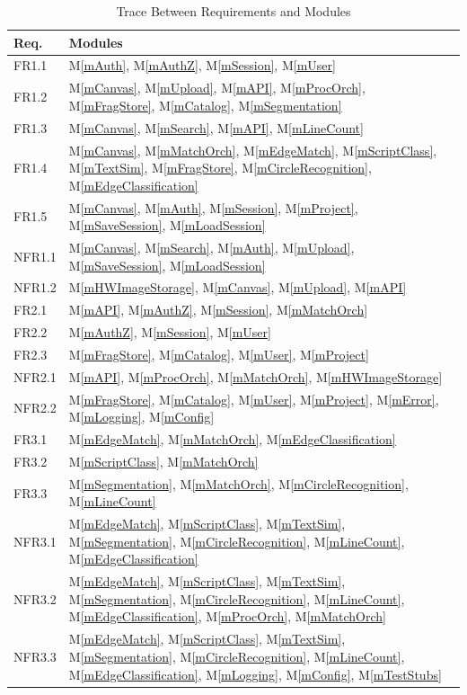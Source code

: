 \documentclass[12pt, titlepage]{article}
\newcommand{\mref}[1]{M\ref{#1}}
\begin{document}
\begin{table}[H]
\centering
\begin{tabular}{p{} p{}}
\toprule
\textbf{Req.} & \textbf{Modules}\\
\midrule
FR1.1 & \mref{mAuth}, \mref{mAuthZ}, \mref{mSession}, \mref{mUser}\\
FR1.2 & \mref{mCanvas}, \mref{mUpload}, \mref{mAPI}, \mref{mProcOrch}, \mref{mFragStore}, \mref{mCatalog}, \mref{mSegmentation}\\
FR1.3 & \mref{mCanvas}, \mref{mSearch}, \mref{mAPI}, \mref{mLineCount}\\
FR1.4 & \mref{mCanvas}, \mref{mMatchOrch}, \mref{mEdgeMatch}, \mref{mScriptClass}, \mref{mTextSim}, \mref{mFragStore}, \mref{mCircleRecognition}, \mref{mEdgeClassification}\\
FR1.5 & \mref{mCanvas}, \mref{mAuth}, \mref{mSession}, \mref{mProject}, \mref{mSaveSession}, \mref{mLoadSession}\\
NFR1.1 & \mref{mCanvas}, \mref{mSearch}, \mref{mAuth}, \mref{mUpload}, \mref{mSaveSession}, \mref{mLoadSession}\\
NFR1.2 & \mref{mHWImageStorage}, \mref{mCanvas}, \mref{mUpload}, \mref{mAPI}\\
FR2.1 & \mref{mAPI}, \mref{mAuthZ}, \mref{mSession}, \mref{mMatchOrch}\\
FR2.2 & \mref{mAuthZ}, \mref{mSession}, \mref{mUser}\\
FR2.3 & \mref{mFragStore}, \mref{mCatalog}, \mref{mUser}, \mref{mProject}\\
NFR2.1 & \mref{mAPI}, \mref{mProcOrch}, \mref{mMatchOrch}, \mref{mHWImageStorage}\\
NFR2.2 & \mref{mFragStore}, \mref{mCatalog}, \mref{mUser}, \mref{mProject}, \mref{mError}, \mref{mLogging}, \mref{mConfig}\\
FR3.1 & \mref{mEdgeMatch}, \mref{mMatchOrch}, \mref{mEdgeClassification}\\
FR3.2 & \mref{mScriptClass}, \mref{mMatchOrch}\\
FR3.3 & \mref{mSegmentation}, \mref{mMatchOrch}, \mref{mCircleRecognition}, \mref{mLineCount}\\
NFR3.1 & \mref{mEdgeMatch}, \mref{mScriptClass}, \mref{mTextSim}, \mref{mSegmentation}, \mref{mCircleRecognition}, \mref{mLineCount}, \mref{mEdgeClassification}\\
NFR3.2 & \mref{mEdgeMatch}, \mref{mScriptClass}, \mref{mTextSim}, \mref{mSegmentation}, \mref{mCircleRecognition}, \mref{mLineCount}, \mref{mEdgeClassification}, \mref{mProcOrch}, \mref{mMatchOrch}\\
NFR3.3 & \mref{mEdgeMatch}, \mref{mScriptClass}, \mref{mTextSim}, \mref{mSegmentation}, \mref{mCircleRecognition}, \mref{mLineCount}, \mref{mEdgeClassification}, \mref{mLogging}, \mref{mConfig}, \mref{mTestStubs}\\

\bottomrule
\end{tabular}
\caption{Trace Between Requirements and Modules}
\label{TblRT}
\end{table}
\end{document}
